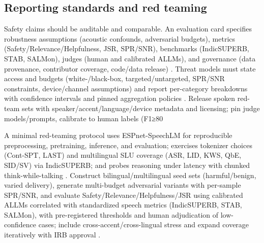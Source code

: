 \subsection{Reporting standards and red teaming} \label{subsec:Reporting standards and red teaming}
Safety claims should be auditable and comparable. An evaluation card specifies robustness assumptions (acoustic confounds, adversarial budgets), metrics (Safety/Relevance/Helpfulness, JSR, SPR/SNR), benchmarks (IndicSUPERB, STAB, SALMon), judges (human and calibrated ALLMs), and governance (data provenance, contributor coverage, code/data release) \cite{vashishth2024stabspeechtokenizerassessmentbenchmark,entry2025indicsuperbspeechprocessinguniversalperf,maimon2025salmonsuiteacousticlanguagemodelevaluati}. Threat models must state access and budgets (white-/black-box, targeted/untargeted, SPR/SNR constraints, device/channel assumptions) and report per-category breakdowns with confidence intervals and pinned aggregation policies \cite{peri2024speechguardexploringadversarialrobustnes}. Release spoken red-team sets with speaker/accent/language/device metadata and licensing; pin judge models/prompts, calibrate to human labels (F1≥80%

A minimal red-teaming protocol uses ESPnet-SpeechLM for reproducible preprocessing, pretraining, inference, and evaluation; exercises tokenizer choices (Cont-SPT, LAST) and multilingual SLU coverage (ASR, LID, KWS, QbE, SID/SV) via IndicSUPERB; and probes reasoning under latency with chunked think-while-talking \cite{tian2025espnetspeechlmopenspeechlanguagemodeltoo,li2025continuousspeechtokenizertext,turetzky2024lastlanguagemodelawarespeechtokenization,entry2025indicsuperbspeechprocessinguniversalperf,chiang2025stitchsimultaneousthinkingtalkingchunked}. Construct bilingual/multilingual seed sets (harmful/benign, varied delivery), generate multi-budget adversarial variants with per-sample SPR/SNR, and evaluate Safety/Relevance/Helpfulness/JSR using calibrated ALLMs correlated with standardized speech metrics (IndicSUPERB, STAB, SALMon), with pre-registered thresholds and human adjudication of low-confidence cases; include cross-accent/cross-lingual stress and expand coverage iteratively with IRB approval \cite{peri2024speechguardexploringadversarialrobustnes,vashishth2024stabspeechtokenizerassessmentbenchmark,maimon2025salmonsuiteacousticlanguagemodelevaluati,fu2025personalizedsociallyassistiverobotsendsp}.

